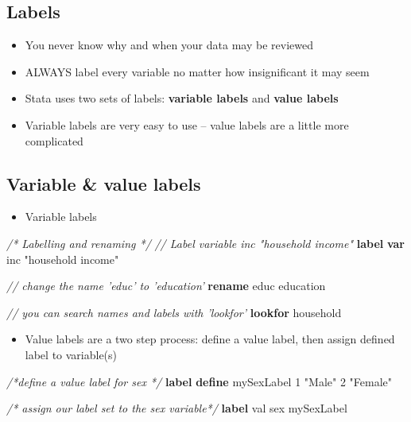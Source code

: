 \documentclass[
]{book}
\newenvironment{Shaded}{\begin{snugshade}}{\end{snugshade}}
\newcommand{\CommentTok}[1]{\textcolor[rgb]{0.56,0.35,0.01}{\textit{#1}}}
\newcommand{\KeywordTok}[1]{\textcolor[rgb]{0.13,0.29,0.53}{\textbf{#1}}}
\newcommand{\NormalTok}[1]{#1}
\newcommand{\StringTok}[1]{\textcolor[rgb]{0.31,0.60,0.02}{#1}}
\providecommand{\tightlist}{%
  \setlength{\itemsep}{0pt}\setlength{\parskip}{0pt}}
\begin{document}
\hypertarget{labels}{%
\subsection{Labels}\label{labels}}

\begin{itemize}
\tightlist
\item
  You never know why and when your data may be reviewed
\item
  ALWAYS label every variable no matter how insignificant it may seem
\item
  Stata uses two sets of labels: \textbf{variable labels} and \textbf{value labels}
\item
  Variable labels are very easy to use -- value labels are a little more complicated
\end{itemize}

\hypertarget{variable-value-labels}{%
\subsection{Variable \& value labels}\label{variable-value-labels}}

\begin{itemize}
\tightlist
\item
  Variable labels
\end{itemize}

\begin{Shaded}
\begin{Highlighting}[]
  \CommentTok{/* Labelling and renaming */}
  \CommentTok{// Label variable inc "household income"}
  \KeywordTok{label} \KeywordTok{var}\NormalTok{ inc }\StringTok{"household income"}

  \CommentTok{// change the name 'educ' to 'education'}
  \KeywordTok{rename}\NormalTok{ educ education}

  \CommentTok{// you can search names and labels with 'lookfor' }
  \KeywordTok{lookfor}\NormalTok{ household}
\end{Highlighting}
\end{Shaded}

\begin{itemize}
\tightlist
\item
  Value labels are a two step process: define a value label, then assign defined label to variable(s)
\end{itemize}

\begin{Shaded}
\begin{Highlighting}[]
  \CommentTok{/*define a value label for sex */}
  \KeywordTok{label} \KeywordTok{define}\NormalTok{ mySexLabel 1 }\StringTok{"Male"}\NormalTok{ 2 }\StringTok{"Female"}

  \CommentTok{/* assign our label set to the sex variable*/}
  \KeywordTok{label}\NormalTok{ val sex  mySexLabel}
\end{Highlighting}
\end{Shaded}
\end{document}
